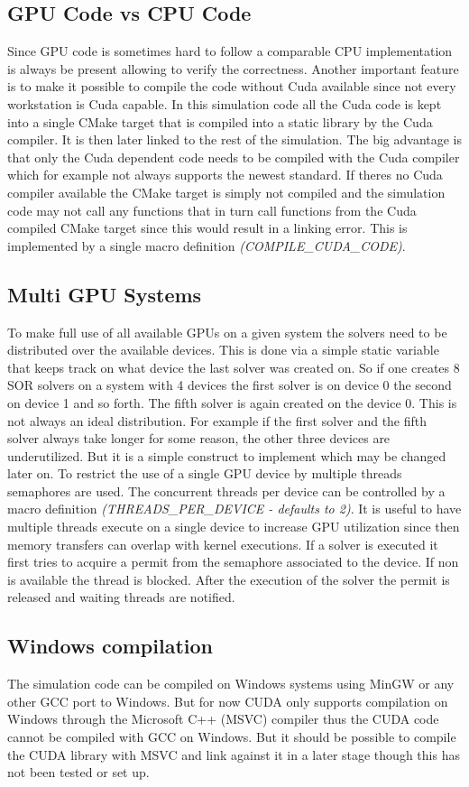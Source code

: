 \documentclass[master.tex]{subfiles}
\begin{document}
\subsection{GPU Code vs CPU Code}
Since GPU code is sometimes hard to follow a comparable CPU implementation is always be present allowing to verify the correctness.\newline
Another important feature is to make it possible to compile the code without Cuda available since not every workstation is Cuda capable. In this simulation code all the Cuda code is kept into a single CMake target that is compiled into a static library by the Cuda compiler. It is then later linked to the rest of the simulation. The big advantage is that only the Cuda dependent code needs to be compiled with the Cuda compiler which for example not always supports the newest standard. If theres no Cuda compiler available the CMake target is simply not compiled and the simulation code may not call any functions that in turn call functions from the Cuda compiled CMake target since this would result in a linking error. This is implemented by a single macro definition \textit{(COMPILE\_CUDA\_CODE)}.

\subsection{Multi GPU Systems}
To make full use of all available GPUs on a given system the solvers need to be distributed over the available devices. This is done via a simple static variable that keeps track on what device the last solver was created on. So if one creates 8 \ac{SOR} solvers on a system with 4 devices the first solver is on device 0 the second on device 1 and so forth. The fifth solver is again created on the device 0. This is not always an ideal distribution. For example if the first solver and the fifth solver always take longer for some reason, the other three devices are underutilized. But it is a simple construct to implement which may be changed later on.\newline
To restrict the use of a single GPU device by multiple threads semaphores are used. The concurrent threads per device can be controlled by a macro definition \textit{(THREADS\_PER\_DEVICE - defaults to 2)}. It is useful to have multiple threads execute on a single device to increase GPU utilization since then memory transfers can overlap with kernel executions. If a solver is executed it first tries to acquire a permit from the semaphore associated to the device. If non is available the thread is blocked. After the execution of the solver the permit is released and waiting threads are notified.

\subsection{Windows compilation}
The simulation code can be compiled on Windows systems using MinGW or any other GCC port to Windows. But for now CUDA only supports compilation on Windows through the Microsoft C++ (MSVC) compiler thus the CUDA code cannot be compiled with GCC on Windows. But it should be possible to compile the CUDA library with MSVC and link against it in a later stage though this has not been tested or set up.
\end{document}
